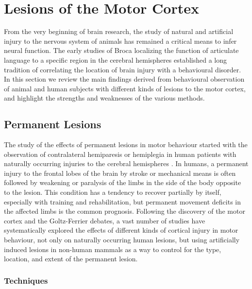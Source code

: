 \section{Lesions of the Motor Cortex}

From the very beginning of brain research, the study of natural and artificial injury to the nervous system of animals has remained a critical means to infer neural function. The early studies of Broca localizing the function of articulate language to a specific region in the cerebral hemispheres \cite{Broca1861} established a long tradition of correlating the location of brain injury with a behavioural disorder. In this section we review the main findings derived from behavioural observation of animal and human subjects with different kinds of lesions to the motor cortex, and highlight the strengths and weaknesses of the various methods.

\subsection{Permanent Lesions}

The study of the effects of permanent lesions in motor behaviour started with the observation of contralateral hemiparesis or hemiplegia in human patients with naturally occurring injuries to the cerebral hemispheres \cite{Louis1994}. In humans, a permanent injury to the frontal lobes of the brain by stroke or mechanical means is often followed by weakening or paralysis of the limbs in the side of the body opposite to the lesion. This condition has a tendency to recover partially by itself, especially with training and rehabilitation, but permanent movement deficits in the affected limbs is the common prognosis. Following the discovery of the motor cortex and the Goltz-Ferrier debates, a vast number of studies have systematically explored the effects of different kinds of cortical injury in motor behaviour, not only on naturally occurring human lesions, but using artificially induced lesions in non-human mammals as a way to control for the type, location, and extent of the permanent lesion.

\subsubsection{Techniques}

